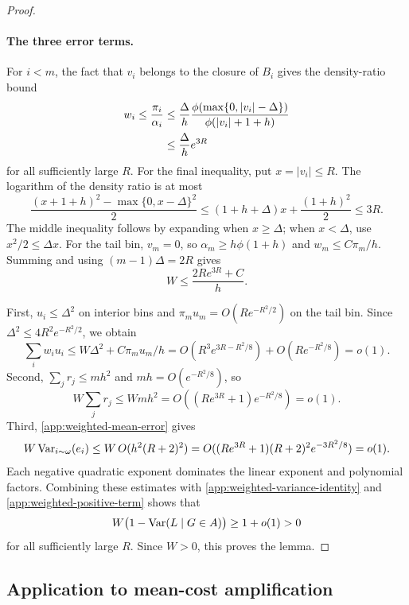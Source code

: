 \begin{proof}
\paragraph{The three error terms.}
For $i<m$, the fact that $v_i$ belongs to the closure of $B_i$
gives the density-ratio bound
\begin{align}
 w_i\le\frac{\pi_i}{\alpha_i}
 &\le\frac{\Delta}{h}
       \frac{\phi(\max\{0,|v_i|-\Delta\})}
            {\phi(|v_i|+1+h)}\notag\\
 &\le\frac{\Delta}{h}e^{3R}
 \label{app:weighted-density-ratio}
\end{align}
for all sufficiently large $R$. For the final inequality, put
$x=|v_i|\le R$. The logarithm of the density ratio is at most
\[
 \frac{(x+1+h)^2-\max\{0,x-\Delta\}^2}{2}
 \le(1+h+\Delta)x+\frac{(1+h)^2}{2}\le3R.
\]
The middle inequality follows by expanding when $x\ge\Delta$;
when $x<\Delta$, use $x^2/2\le\Delta x$.
For the tail bin, $v_m=0$, so
$\alpha_m\ge h\phi(1+h)$ and $w_m\le C\pi_m/h$.
Summing and using $(m-1)\Delta=2R$ gives
\begin{equation}\label{app:weighted-total-weight}
 W\le\frac{2Re^{3R}+C}{h}.
\end{equation}

First, $u_i\le\Delta^2$ on interior bins and
$\pi_mu_m=O(Re^{-R^2/2})$ on the tail bin. Since
$\Delta^2\le4R^2e^{-R^2/2}$, we obtain
\[
 \sum_iw_iu_i
 \le W\Delta^2+C\pi_mu_m/h
 =O(R^3e^{3R-R^2/8})+O(Re^{-R^2/8})=o(1).
\]
Second, $\sum_jr_j\le mh^2$ and $mh=O(e^{-R^2/8})$, so
\[
 W\sum_jr_j\le Wmh^2
 =O((Re^{3R}+1)e^{-R^2/8})=o(1).
\]
Third, \eqref{app:weighted-mean-error} gives
\[
 W\operatorname{Var}_{i\sim\omega}(e_i)
 \le W\,O(h^2(R+2)^2)
 =O((Re^{3R}+1)(R+2)^2e^{-3R^2/8})=o(1).
\]
Each negative quadratic exponent dominates the linear exponent and
polynomial factors. Combining these estimates with
\eqref{app:weighted-variance-identity} and
\eqref{app:weighted-positive-term} shows that
\[
 W\bigl(1-\operatorname{Var}(L\mid G\in A)\bigr)\ge1+o(1)>0
\]
for all sufficiently large $R$. Since $W>0$, this proves the lemma.
\end{proof}

\subsection{Application to mean-cost amplification}
\label{app:weighted-transfer}


